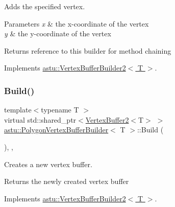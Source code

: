 Adds the specified vertex.


\begin{DoxyParams}{Parameters}
{\em x} & the x-\/coordinate of the vertex \\
\hline
{\em y} & the y-\/coordinate of the vertex \\
\hline
\end{DoxyParams}
\begin{DoxyReturn}{Returns}
reference to this builder for method chaining 
\end{DoxyReturn}


Implements \hyperlink{classastu_1_1VertexBufferBuilder2_ab96f2f382b9f855ead02ed2cd1391147}{astu\+::\+Vertex\+Buffer\+Builder2$<$ T $>$}.

\mbox{\label{classastu_1_1PolygonVertexBufferBuilder_a4e598b21be17c556a444da88f2388319}} 
\subsubsection{\texorpdfstring{Build()}{Build()}}
{\footnotesize\ttfamily template$<$typename T $>$ \\
virtual std\+::shared\+\_\+ptr$<$\hyperlink{classastu_1_1VertexBuffer2}{Vertex\+Buffer2}$<$T$>$ $>$ \hyperlink{classastu_1_1PolygonVertexBufferBuilder}{astu\+::\+Polygon\+Vertex\+Buffer\+Builder}$<$ T $>$\+::Build (\begin{DoxyParamCaption}{ }\end{DoxyParamCaption})\hspace{0.3cm}{\ttfamily [inline]}, {\ttfamily [override]}, {\ttfamily [virtual]}}

Creates a new vertex buffer.

\begin{DoxyReturn}{Returns}
the newly created vertex buffer 
\end{DoxyReturn}


Implements \hyperlink{classastu_1_1VertexBufferBuilder2_a69ce65106844f82fcc34632bfa0d6450}{astu\+::\+Vertex\+Buffer\+Builder2$<$ T $>$}.

\mbox{\label{classastu_1_1PolygonVertexBufferBuilder_a4fd022aa954b7f41db8c34349286e3e3}} 
